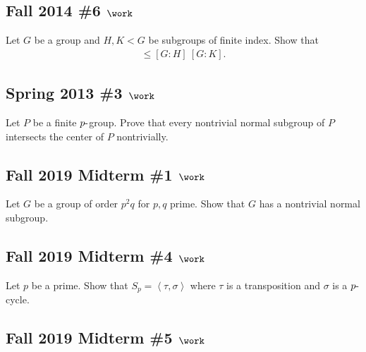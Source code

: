 \hypertarget{fall-2014-6-work}{%
\subsection{\texorpdfstring{Fall 2014 \#6
\(\work\)}{Fall 2014 \#6 \textbackslash work}}\label{fall-2014-6-work}}

Let \(G\) be a group and \(H, K < G\) be subgroups of finite index. Show
that
\begin{align*}
[G: H\cap K] \leq [G: H] ~ [G:K]
.\end{align*}

\hypertarget{spring-2013-3-work}{%
\subsection{\texorpdfstring{Spring 2013 \#3
\(\work\)}{Spring 2013 \#3 \textbackslash work}}\label{spring-2013-3-work}}

Let \(P\) be a finite \(p{\hbox{-}}\)group. Prove that every nontrivial
normal subgroup of \(P\) intersects the center of \(P\) nontrivially.

\hypertarget{fall-2019-midterm-1-work}{%
\subsection{\texorpdfstring{Fall 2019 Midterm \#1
\(\work\)}{Fall 2019 Midterm \#1 \textbackslash work}}\label{fall-2019-midterm-1-work}}

Let \(G\) be a group of order \(p^2q\) for \(p, q\) prime. Show that
\(G\) has a nontrivial normal subgroup.

\hypertarget{fall-2019-midterm-4-work}{%
\subsection{\texorpdfstring{Fall 2019 Midterm \#4
\(\work\)}{Fall 2019 Midterm \#4 \textbackslash work}}\label{fall-2019-midterm-4-work}}

Let \(p\) be a prime. Show that
\(S_p = \left\langle{\tau, \sigma}\right\rangle\) where \(\tau\) is a
transposition and \(\sigma\) is a \(p{\hbox{-}}\)cycle.

\hypertarget{fall-2019-midterm-5-work}{%
\subsection{\texorpdfstring{Fall 2019 Midterm \#5
\(\work\)}{Fall 2019 Midterm \#5 \textbackslash work}}\label{fall-2019-midterm-5-work}}

